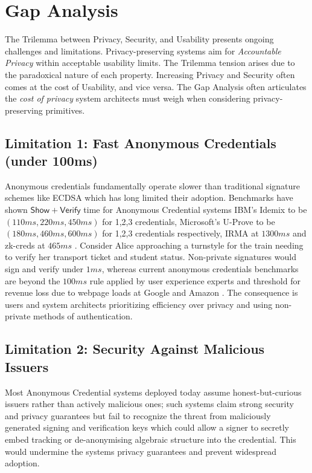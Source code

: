 \section{Gap Analysis}
The Trilemma between Privacy, Security, and Usability presents ongoing challenges and limitations. Privacy-preserving systems aim for \emph{Accountable Privacy} within acceptable usability limits. The Trilemma tension arises due to the paradoxical nature of each property. Increasing Privacy and Security often comes at the cost of Usability, and vice versa. The Gap Analysis often articulates the \emph{cost of privacy} system architects must weigh when considering privacy-preserving primitives.

\subsection{Limitation 1: Fast Anonymous Credentials (under 100ms) }\label{subsec:chap1_limitation1}

Anonymous credentials fundamentally operate slower than traditional signature schemes like ECDSA which has long limited their adoption. Benchmarks \cite{habib_evaluation_2016} have shown $\mathsf{Show + Verify}$ time for Anonymous Credential systems IBM's Idemix to be $(110ms, 220ms, 450ms)$ for 1,2,3 credentials, Microsoft's U-Prove to be $(180ms, 460ms, 600ms)$ for 1,2,3 credentials respectively, IRMA \cite{fischer-hubner_towards_2013} at $1300ms$ and zk-creds at $465ms$ \cite{rosenberg_zk-creds_2022}. Consider Alice approaching a turnstyle for the train needing to verify her transport ticket and student status. Non-private signatures would sign and verify under $1ms$, whereas current anonymous credentials benchmarks are beyond the $100ms$ rule applied by user experience experts \cite{jakob_nielsen_powers_2009} and threshold for revenue loss due to webpage loads at Google and Amazon \cite{linden_geeking_2006}. The consequence is users and system architects prioritizing efficiency over privacy and using non-private methods of authentication. 


\subsection{Limitation 2: Security Against Malicious Issuers}
Most Anonymous Credential systems deployed today assume honest-but-curious issuers rather than actively malicious ones; such systems claim strong security and privacy guarantees but fail to recognize the threat from maliciously generated signing and verification keys which could allow a signer to secretly embed tracking or de-anonymising algebraic structure into the credential. This would undermine the systems privacy guarantees and prevent widespread adoption. 


